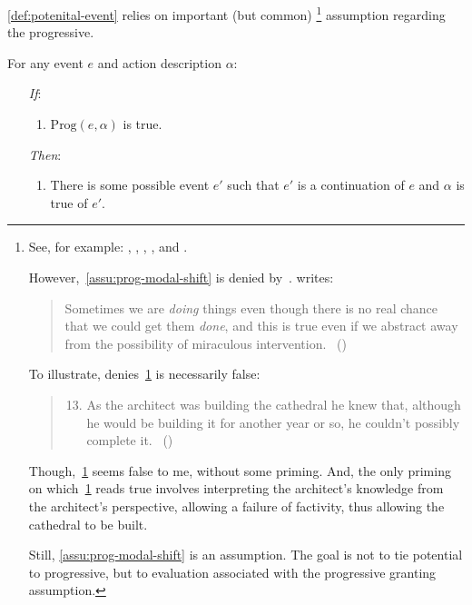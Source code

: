 \begin{note}
  \autoref{def:potenital-event} relies on important (but common)%
  \footnote{
    See, for example:
    \textcite{Bennett:1972uw},
    \textcite{Dowty:1979vq},
    \textcite{Parsons:1990aa},
    \textcite{Landman:1992wh}, and
    \textcite{Portner:1998um}.

    However,~\autoref{assu:prog-modal-shift} is denied by~\textcite{Szabo:2004ul}.
    \citeauthor{Szabo:2004ul} writes:
    \begin{quote}
      Sometimes we are \emph{doing} things even though there is no real chance that we could get them \emph{done}, and this is true even if we abstract away from the possibility of miraculous intervention.%
      \mbox{ }\hfill\mbox{(\citeyear[40]{Szabo:2004ul})}
    \end{quote}
    To illustrate, \citeauthor{Szabo:2004ul} denies~\ref{Szabo:Arch} is necessarily false:
    \begin{quote}
      \begin{enumerate}[label=(\arabic*), ref=(\arabic*)]
        \setcounter{enumi}{12}
      \item
        \label{Szabo:Arch}
        As the architect was building the cathedral he knew that, although he would be building it for another year or so, he couldn't possibly complete it.%
        \mbox{ }\hfill\mbox{(\citeyear[38]{Szabo:2004ul})}
      \end{enumerate}
    \end{quote}
    Though,~\ref{Szabo:Arch} seems false to me, without some priming.
    And, the only priming on which~\ref{Szabo:Arch} reads true involves interpreting the architect's knowledge from the architect's perspective, allowing a failure of factivity, thus allowing the cathedral to be built.

    Still, \autoref{assu:prog-modal-shift} is an assumption.
    The goal is not to tie potential to progressive, but to evaluation associated with the progressive granting assumption.
  }
  assumption regarding the progressive.

  \begin{assumption}
    \label{assu:prog-modal-shift}
    For any event \(e\) and action description \(\alpha\):
    \begin{enumerate}
    \item[\emph{If}:]
      \begin{enumerate}[label=\alph*., ref=(\alph*)]
      \item
        \(\text{Prog}(e, \alpha)\) is true.
      \end{enumerate}
    \item[\emph{Then}:]
      \begin{enumerate}[label=\alph*., ref=(\alph*), resume]
      \item
        There is some possible event \(e'\) such that \(e'\) is a continuation of \(e\) and \(\alpha\) is true of \(e'\).
      \end{enumerate}
    \end{enumerate}
    \vspace{-\baselineskip}
  \end{assumption}


\end{note}
